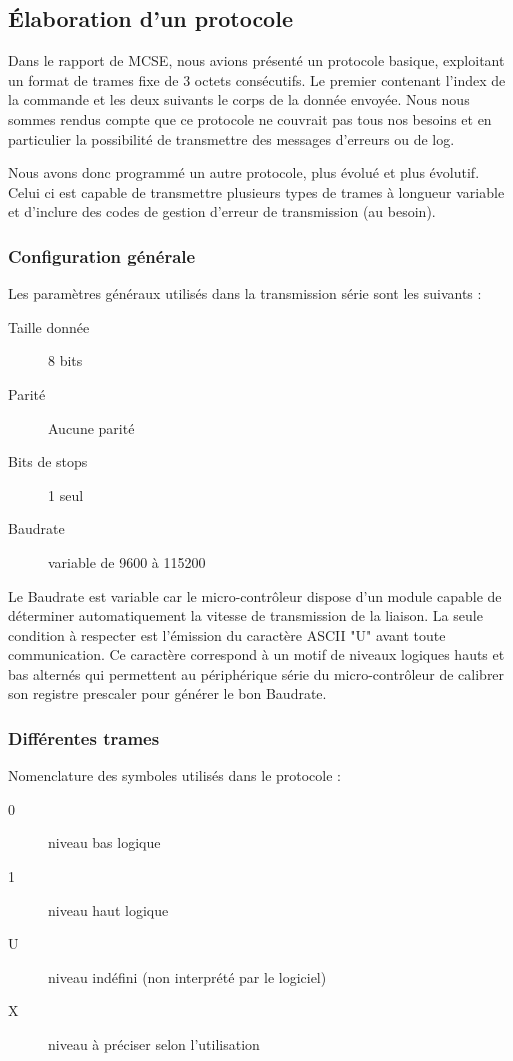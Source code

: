 \documentclass[11pt, french]{article} %
\begin{document}
\subsection{Élaboration d'un protocole}
Dans le rapport de MCSE, nous avions présenté un protocole basique, exploitant un format de trames fixe de 3 octets consécutifs. Le premier contenant l'index de la commande et les deux suivants le corps de la donnée envoyée. Nous nous sommes rendus compte que ce protocole ne couvrait pas tous nos besoins et en particulier la possibilité de transmettre des messages d'erreurs ou de log.

\medskip
Nous avons donc programmé un autre protocole, plus évolué et plus évolutif. Celui ci est capable de transmettre plusieurs types de trames à longueur variable et d'inclure des codes de gestion d'erreur de transmission (au besoin).

\subsubsection{Configuration générale}
\noindent
Les paramètres généraux utilisés dans la transmission série sont les suivants :
\begin{description}
	\item[Taille donnée] 8 bits
	\item[Parité] Aucune parité
	\item[Bits de stops] 1 seul
	\item[Baudrate] variable de 9600 à 115200
\end{description}

\medskip
Le Baudrate est variable car le micro-contrôleur dispose d'un module capable de déterminer automatiquement la vitesse de transmission de la liaison. La seule condition à respecter est l'émission du caractère ASCII "U" avant toute communication. Ce caractère correspond à un motif de niveaux logiques hauts et bas alternés qui permettent au périphérique série du micro-contrôleur de calibrer son registre prescaler pour générer le bon Baudrate.

\subsubsection{Différentes trames}
\noindent
Nomenclature des symboles utilisés dans le protocole :

\medskip
\begin{description}
	\item[0] niveau bas logique
	\item[1] niveau haut logique
	\item[U] niveau indéfini (non interprété par le logiciel)
	\item[X] niveau à préciser selon l'utilisation
\end{description}
\end{document}
